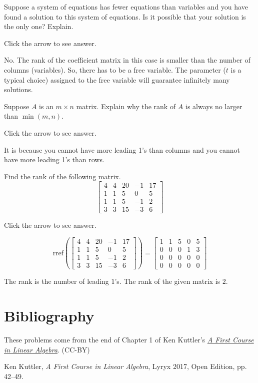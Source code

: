\documentclass{ximera}
\begin{document}
\begin{problem}\label{prb:2.39} Suppose a system of equations has fewer equations than variables and
you have found a solution to this system of equations. Is it possible that
your solution is the only one? Explain.

Click the arrow to see answer. 
\begin{expandable}
No. The rank of the coefficient matrix in this case is smaller than the number of columns (variables).  So, there has to be a free variable.  The parameter ($t$ is a typical choice) assigned to the free variable will guarantee infinitely many solutions.
\end{expandable}
\end{problem}

\begin{problem}\label{prb:2.55} Suppose $A$ is an $m\times n$ matrix. Explain why the rank of $A$ is
always no larger than $\min \left( m,n\right).$

Click the arrow to see answer. 
\begin{expandable}
It is because you cannot
have more leading 1's than columns and you cannot have more leading 1's than rows.
\end{expandable}
\end{problem}

\begin{problem}\label{prb:2.53} Find the rank of the following matrix.
$$\begin{bmatrix}
4 & 4 & 20 & -1 & 17 \\
1 & 1 & 5 & 0 & 5 \\
1 & 1 & 5 & -1 & 2 \\
3 & 3 & 15 & -3 & 6
\end{bmatrix}$$

Click the arrow to see answer. 
\begin{expandable}
$$\text{rref}\left(\begin{bmatrix}4 & 4 & 20 & -1 & 17 \\
1 & 1 & 5 & 0 & 5 \\
1 & 1 & 5 & -1 & 2 \\
3 & 3 & 15 & -3 & 6\end{bmatrix}\right)=\begin{bmatrix}1 &1 &5 &0 &5\\
 0 & 0 &0 &1 &3\\
 0 &0 &0 &0 &0\\
 0& 0& 0& 0& 0\end{bmatrix}$$

 The rank is the number of leading $1$'s.  The rank of the given matrix is $2$.
\end{expandable}
\end{problem}

\section*{Bibliography}
These problems come from the end of Chapter 1 of Ken Kuttler's \href{https://open.umn.edu/opentextbooks/textbooks/a-first-course-in-linear-algebra-2017}{\it A First Course in Linear Algebra}. (CC-BY)

Ken Kuttler, {\it  A First Course in Linear Algebra}, Lyryx 2017, Open Edition, pp. 42--49. 
\end{document}
